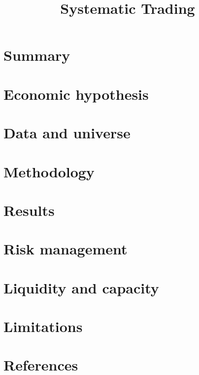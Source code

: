 \documentclass[11pt,letterpaper]{article}
\title{Systematic Trading}
\author{}
\date{}
\begin{document}
\maketitle

\section{Summary}

\section{Economic hypothesis}

\section{Data and universe}

\section{Methodology}

\section{Results}

\section{Risk management}

\section{Liquidity and capacity}

\section{Limitations}

\section*{References}
\end{document}
